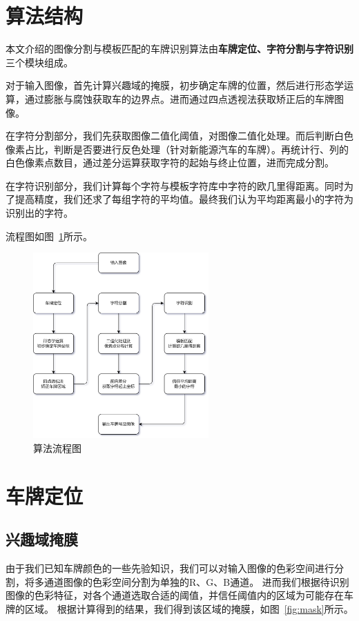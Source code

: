 \documentclass[utf8,a4paper]{ctexart}
\begin{document}
\section{算法结构}
本文介绍的图像分割与模板匹配的车牌识别算法由\textbf{车牌定位、字符分割与字符识别}三个模块组成。

对于输入图像，首先计算兴趣域的掩膜，初步确定车牌的位置，然后进行形态学运算，通过膨胀与腐蚀获取车的边界点。进而通过四点透视法获取矫正后的车牌图像。

在字符分割部分，我们先获取图像二值化阈值，对图像二值化处理。而后判断白色像素占比，判断是否要进行反色处理（针对新能源汽车的车牌）。再统计行、列的白色像素点数目，通过差分运算获取字符的起始与终止位置，进而完成分割。

在字符识别部分，我们计算每个字符与模板字符库中字符的欧几里得距离。同时为了提高精度，我们还求了每组字符的平均值。最终我们认为平均距离最小的字符为识别出的字符。

流程图如图~\ref{fig:plate_recognition}所示。

\begin{figure}[h]
    \centering
    \includegraphics[width=0.6\textwidth]{./img/pic.png}
    \caption{算法流程图}
    \label{fig:plate_recognition}
\end{figure}

\section{车牌定位}
\subsection{兴趣域掩膜}
由于我们已知车牌颜色的一些先验知识，我们可以对输入图像的色彩空间进行分割，将多通道图像的色彩空间分割为单独的R、G、B通道。
进而我们根据待识别图像的色彩特征，对各个通道选取合适的阈值，并信任阈值内的区域为可能存在车牌的区域。
根据计算得到的结果，我们得到该区域的掩膜，如图~\ref{fig:mask}所示。
\end{document}
